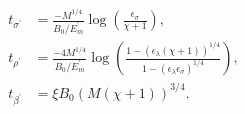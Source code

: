 \documentclass{pnastwo}
\begin{document}
\begin{article}
\begin{align}
t_{\sigma^\prime} &= \frac{-M^{1/4}}{B_0/E_m^\prime}\log \left(\frac{\epsilon_\sigma}{\chi +1}\right), \\ \nonumber
t_{\rho^\prime} &= \frac{-4 M^{1/4} }{B_0/E_m^\prime}\log \left(\frac{1-( \epsilon_\lambda(\chi +1))^{1/4}}{1-(\epsilon_\lambda \epsilon_\sigma)^{1/4}}\right), \\ \nonumber
t_{\beta^\prime} &= \xi B_0\left(M(\chi + 1)\right)^{3/4}.
\end{align}

















\end{article}
\end{document}
